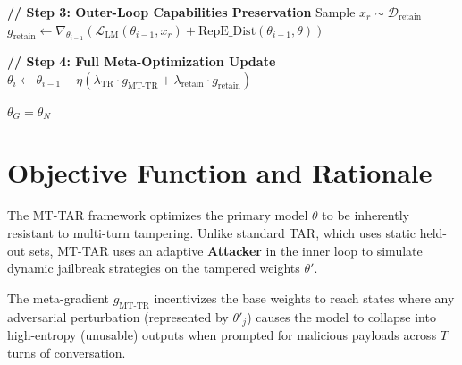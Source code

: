 \documentclass{article}
\begin{document}
\begin{algorithm}
\begin{algorithmic}[1]
    \STATE \textbf{// Step 3: Outer-Loop Capabilities Preservation}
    \STATE Sample $x_r \sim \mathcal{D}_{\text{retain}}$
    \STATE $g_{\text{retain}} \leftarrow \nabla_{\theta_{i-1}} \left( \mathcal{L}_{\text{LM}}(\theta_{i-1}, x_r) + \text{RepE\_Dist}(\theta_{i-1}, \theta) \right)$
    
    \STATE \textbf{// Step 4: Full Meta-Optimization Update}
    \STATE $\theta_i \leftarrow \theta_{i-1} - \eta \left( \lambda_{\text{TR}} \cdot g_{\text{MT-TR}} + \lambda_{\text{retain}} \cdot g_{\text{retain}} \right)$
\ENDFOR

\RETURN $\theta_G = \theta_N$
\end{algorithmic}
\end{algorithm}

\section*{Objective Function and Rationale}
The MT-TAR framework optimizes the primary model $\theta$ to be inherently resistant to multi-turn tampering. Unlike standard TAR, which uses static held-out sets, MT-TAR uses an adaptive \textbf{Attacker} in the inner loop to simulate dynamic jailbreak strategies on the tampered weights $\theta'$. 

The meta-gradient $g_{\text{MT-TR}}$ incentivizes the base weights to reach states where any adversarial perturbation (represented by $\theta'_j$) causes the model to collapse into high-entropy (unusable) outputs when prompted for malicious payloads across $T$ turns of conversation.
\end{document}
